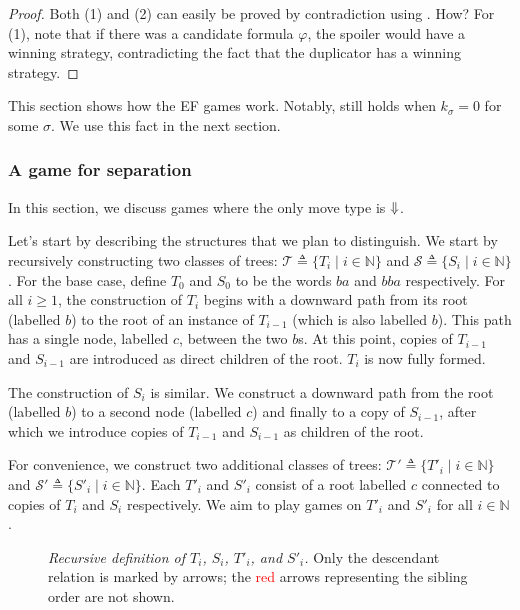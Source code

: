 \documentclass[a4paper,UKenglish,cleveref, autoref, thm-restate, numberwithinsect]{lipics-v2021}
\def\Darrow{\ensuremath\mathord{\Downarrow}}
\begin{document}
\begin{proof}
    Both (1) and (2) can easily be proved by contradiction using . How? For (1), note that if there was a candidate formula $\varphi$, the spoiler would have a winning strategy, contradicting the fact that the duplicator has a winning strategy. %
\end{proof}
This section shows how the EF games work. Notably,  still holds when $k_\sigma = 0$ for some $\sigma$. We use this fact in the next section.

\subsubsection{A game for separation}

In this section, we discuss games where the only move type is $\Darrow$.

Let's start by describing the structures that we plan to distinguish. We start by recursively constructing two classes of trees: $\mathcal{T} \triangleq \{T_i \mid i \in \mathbb{N}\}$ and $\mathcal{S} \triangleq \{S_i \mid i \in \mathbb{N} \}$. For the base case, define $T_0$ and $S_0$ to be the words $ba$ and $bba$ respectively. For all $i \geq 1$, the construction of $T_i$ begins with a downward path from its root (labelled $b$) to the root of an instance of $T_{i - 1}$ (which is also labelled $b$). This path has a single node, labelled $c$, between the two $b$s. At this point, copies of $T_{i - 1}$ and $S_{i - 1}$ are introduced as direct children of the root. $T_i$ is now fully formed.

The construction of $S_i$ is similar. We construct a downward path from the root (labelled $b$) to a second node (labelled $c$) and finally to a copy of $S_{i - 1}$, after which we introduce copies of $T_{i - 1}$ and $S_{i - 1}$ as children of the root.

For convenience, we construct two additional classes of trees: $\mathcal{T}' \triangleq \{T'_i \mid i \in \mathbb{N}\}$ and $\mathcal{S}' \triangleq \{S'_i \mid i \in \mathbb{N} \}$. Each $T'_i$ and $S'_i$ consist of a root labelled $c$ connected to copies of $T_i$ and $S_i$ respectively. We aim to play games on $T'_i$ and $S'_i$ for all $i \in \mathbb{N}$.

\begin{figure}[h]
    \centering
    \caption{\emph{Recursive definition of $T_i$, $S_i$, $T'_i$, and $S'_i$.} Only the descendant relation is marked by arrows; the \textcolor{red}{red} arrows representing the sibling order are not shown.}
    \label{structureinit}
\end{figure}
\end{document}
